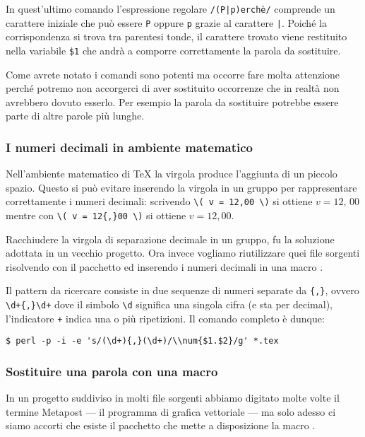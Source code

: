In quest'ultimo comando l'espressione regolare \texttt{/(P|p)erchè/} comprende
un carattere iniziale che può essere \texttt{P} oppure \texttt{p} grazie al
carattere \texttt{|}. Poiché la corrispondenza si trova tra parentesi tonde, il
carattere trovato viene restituito nella variabile \texttt{\$1} che andrà a
comporre correttamente la parola da sostituire.

Come avrete notato i comandi sono potenti ma occorre fare molta attenzione
perché potremo non accorgerci di aver sostituito occorrenze che in realtà non
avrebbero dovuto esserlo. Per esempio la parola da sostituire potrebbe essere
parte di altre parole più lunghe.

\subsubsection{I numeri decimali in ambiente matematico}

Nell'ambiente matematico di \TeX{} la virgola produce l'aggiunta di un piccolo
spazio. Questo si può evitare inserendo la virgola in un gruppo per
rappresentare correttamente i numeri decimali: scrivendo \verb!\( v = 12,00 \)!
si ottiene \( v = 12,\, 00 \) mentre con \verb!\( v = 12{,}00 \)! si ottiene \(
v = 12,00 \).

Racchiudere la virgola di separazione decimale in un gruppo, fu la soluzione
adottata in un vecchio progetto. Ora invece vogliamo riutilizzare quei file
sorgenti risolvendo con il pacchetto  ed inserendo i numeri
decimali in una macro .

Il pattern da ricercare consiste in due sequenze di numeri separate da
\texttt{\{,\}}, ovvero \verb=\d+{,}\d+= dove il simbolo \verb=\d= significa una
singola cifra (e sta per decimal), l'indicatore \texttt{+} indica una o più
ripetizioni. Il comando completo è dunque:
\begin{verbatim}
$ perl -p -i -e 's/(\d+){,}(\d+)/\\num{$1.$2}/g' *.tex
\end{verbatim}



\subsubsection{Sostituire una parola con una macro}

In un progetto suddiviso in molti file sorgenti abbiamo digitato molte volte il
termine Metapost --- il programma di grafica vettoriale --- ma solo adesso ci
siamo accorti che esiste il pacchetto  che mette a
disposizione la macro .


